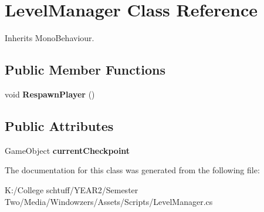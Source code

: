 \hypertarget{class_level_manager}{}\section{Level\+Manager Class Reference}
\label{class_level_manager}


Inherits Mono\+Behaviour.

\subsection*{Public Member Functions}
\begin{DoxyCompactItemize}
\item 
\mbox{\label{class_level_manager_acd6cf3c8677b18f22085b2849b869b48}} 
void {\bfseries Respawn\+Player} ()
\end{DoxyCompactItemize}
\subsection*{Public Attributes}
\begin{DoxyCompactItemize}
\item 
\mbox{\label{class_level_manager_a414cc058ed41878d5345620787aa814f}} 
Game\+Object {\bfseries current\+Checkpoint}
\end{DoxyCompactItemize}


The documentation for this class was generated from the following file\+:\begin{DoxyCompactItemize}
\item 
K\+:/\+College schtuff/\+Y\+E\+A\+R2/\+Semester Two/\+Media/\+Windowzers/\+Assets/\+Scripts/Level\+Manager.\+cs\end{DoxyCompactItemize}
